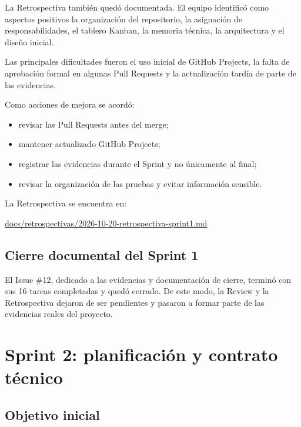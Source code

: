\documentclass[11pt,a4paper,oneside]{report}
\newcommand{\src}[2]{\href{#1}{#2}}
\begin{document}
La Retrospectiva también quedó documentada. El equipo identificó como aspectos positivos la organización del repositorio, la asignación de responsabilidades, el tablero Kanban, la memoria técnica, la arquitectura y el diseño inicial.

Las principales dificultades fueron el uso inicial de GitHub Projects, la falta de aprobación formal en algunas Pull Requests y la actualización tardía de parte de las evidencias.

Como acciones de mejora se acordó:

\begin{itemize}
\item revisar las Pull Requests antes del merge;
\item mantener actualizado GitHub Projects;
\item registrar las evidencias durante el Sprint y no únicamente al final;
\item revisar la organización de las pruebas y evitar información sensible.
\end{itemize}

La Retrospectiva se encuentra en:

\src{https://github.com/rrrarrra9/AhorraTenergia/blob/main/docs/retrospectivas/2026-10-20-retrospectiva-sprint1.md}{docs/retrospectivas/2026-10-20-retrospectiva-sprint1.md}

\section{Cierre documental del Sprint 1}

El Issue \#12, dedicado a las evidencias y documentación de cierre, terminó con sus 16 tareas completadas y quedó cerrado. De este modo, la Review y la Retrospectiva dejaron de ser pendientes y pasaron a formar parte de las evidencias reales del proyecto.


\chapter{Sprint 2: planificación y contrato técnico}

\section{Objetivo inicial}
\end{document}
